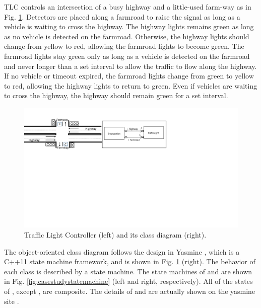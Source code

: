 \label{subsec:tlc}
TLC controls an intersection of a busy highway and a little-used farm-way as in Fig. \ref{fig:casestudy}.
Detectors are placed along a farmroad to raise the signal  as long as a vehicle is waiting to cross the highway. 
The highway lights remains green as long as no vehicle is detected on the farmroad. 
Otherwise, the highway lights should change from yellow to red, allowing the farmroad lights to become green. 
The farmroad lights stay green only as long as a vehicle is detected on the farmroad and never longer than a set interval to allow the traffic to flow along the highway. 
If no vehicle or timeout expired, the farmroad lights change from green to yellow to red, allowing the highway lights to return to green. 
Even if vehicles are waiting to cross the highway, the highway should remain green for a set interval.




\begin{figure}
	\centering
	\includegraphics[clip, trim=0.6cm 12.5cm 10.9cm 1.8cm, width=1.0\columnwidth]{figures/casestudy}
	\caption{Traffic Light Controller (left) and its class diagram (right).} 
	\label{fig:casestudy}
\end{figure}


The object-oriented class diagram follows the design in Yasmine \cite{trafficlight}, which is a C++11 state machine framework, and is shown in Fig. \ref{fig:casestudy} (right).
The behavior of each class is described by a state machine.
The state machines of  and  are shown in Fig. \ref{fig:casestudystatemachine} (left and right, respectively).
All of the states of , except , are composite.
The details of  and  are actually shown on the yasmine site \cite{trafficlight}.

